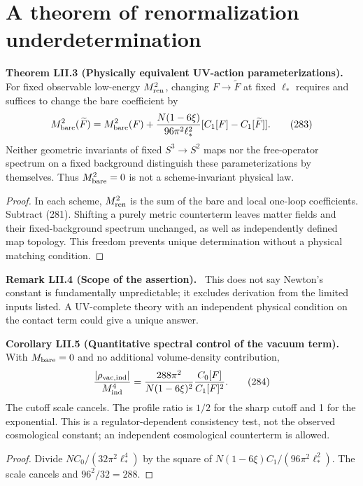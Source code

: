 \documentclass[11pt,a4paper,oneside]{book}
\newcommand{\statement}[3]{\par\medskip\noindent\textbf{#1 #2 (#3).}\ }
\begin{document}
\section{A theorem of renormalization underdetermination}
\statement{Theorem}{LII.3}{Physically equivalent UV-action parameterizations}
For fixed observable low-energy $M_{\rm ren}^2$, changing $F\to\widetilde F$ at fixed $\ell_*$ requires and suffices to change the bare coefficient by
\begin{equation}M_{\rm bare}^2(\widetilde F)=M_{\rm bare}^2(F)+\frac{N(1-6\xi)}{96\pi^2\ell_*^2}[C_1[F]-C_1[\widetilde F]].\tag{283}\end{equation}
Neither geometric invariants of fixed $S^3\to S^2$ maps nor the free-operator spectrum on a fixed background distinguish these parameterizations by themselves. Thus $M_{\rm bare}^2=0$ is not a scheme-invariant physical law.
\begin{proof}
In each scheme, $M_{\rm ren}^2$ is the sum of the bare and local one-loop coefficients. Subtract (281). Shifting a purely metric counterterm leaves matter fields and their fixed-background spectrum unchanged, as well as independently defined map topology. This freedom prevents unique determination without a physical matching condition.
\end{proof}
\statement{Remark}{LII.4}{Scope of the assertion}
This does not say Newton's constant is fundamentally unpredictable; it excludes derivation from the limited inputs listed. A UV-complete theory with an independent physical condition on the contact term could give a unique answer.
\statement{Corollary}{LII.5}{Quantitative spectral control of the vacuum term}
With $M_{\rm bare}=0$ and no additional volume-density contribution,
\begin{equation}\frac{|\rho_{\rm vac,ind}|}{M_{\rm ind}^4}=\frac{288\pi^2}{N(1-6\xi)^2}\frac{C_0[F]}{C_1[F]^2}.\tag{284}\end{equation}
The cutoff scale cancels. The profile ratio is $1/2$ for the sharp cutoff and 1 for the exponential. This is a regulator-dependent consistency test, not the observed cosmological constant; an independent cosmological counterterm is allowed.
\begin{proof}
Divide $NC_0/(32\pi^2\ell_*^4)$ by the square of $N(1-6\xi)C_1/(96\pi^2\ell_*^2)$. The scale cancels and $96^2/32=288$.
\end{proof}
\end{document}
